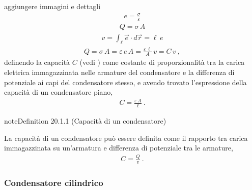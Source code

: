 \documentclass[letterpaper,10pt,italian]{jupyterBook}
\begin{document}
\sphinxAtStartPar
{} aggiungere immagini e dettagli
\begin{equation*}
\begin{split}e = \frac{\sigma}{\varepsilon}\end{split}
\end{equation*}\begin{equation*}
\begin{split}Q = \sigma \, A\end{split}
\end{equation*}\begin{equation*}
\begin{split}v = \int_{\ell} \vec{e} \cdot d \vec{r} = \ell \, e\end{split}
\end{equation*}\begin{equation*}
\begin{split} Q = \sigma \, A = \varepsilon \, e \, A = \frac{\varepsilon \, \ell}{A} \, v = C \, v \ ,\end{split}
\end{equation*}
\sphinxAtStartPar
definendo la capacità \(C\) (vedi {\hyperref[\detokenize{ch/electromagnetism/electrostatics:capacitor-capacity}]{}}) come costante di proporzionalità tra la carica elettrica immagazzinata nelle armature del condensatore e la differenza di potenziale ai capi del condensatore stesso, e avendo trovato l’espressione della capacità di un condensatore piano,
\begin{equation*}
\begin{split}C = \frac{\varepsilon \, A}{\ell} \ .\end{split}
\end{equation*}\label{ch/electromagnetism/electrostatics:capacitor-capacity}
\begin{sphinxadmonition}{note}{Definition 20.1.1 (Capacità di un condensatore)}



\sphinxAtStartPar
La capacità di un condensatore può essere definita come il rapporto tra carica immagazzinata su un’armatura e differenza di potenziale tra le armature,
\begin{equation*}
\begin{split}C = \frac{Q}{v} \ .\end{split}
\end{equation*}\end{sphinxadmonition}
\subsubsection*{Condensatore cilindrico}
\end{document}
